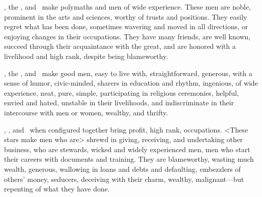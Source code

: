 \Mercury, the \Sun, and \Venus\, make polymaths and men of wide experience. These men are noble, prominent in the arts and sciences, worthy of trusts and positions. They easily regret what has been done, sometimes wavering and moved in all directions, or enjoying changes in their occupations. They have many friends, are well known, succeed through their acquaintance with the great, and are honored with a livelihood and high rank, despite being blameworthy.

\Mercury, the \Moon, and \Venus\, make good men, easy to live with, straightforward, generous, with a sense of humor, civic-minded, sharers in education and rhythm, ingenious, of wide experience, neat, pure, simple, participating in religious ceremonies, helpful, envied and hated, unstable in their livelihoods, and indiscriminate in their intercourse with men or women, wealthy, and thrifty.

\Mercury, \Mars, and \Venus\, when configured together bring profit, high rank, occupations. <These stars make men who are> shrewd in giving, receiving, and undertaking other business, who are stewards, wicked and widely experienced men, men who start their careers with documents and training. They are blameworthy, wasting much wealth, generous, wallowing in loans and debts and defaulting, embezzlers of others’ money, seducers, deceiving with their charm, wealthy, malignant—but repenting of what they have done.

